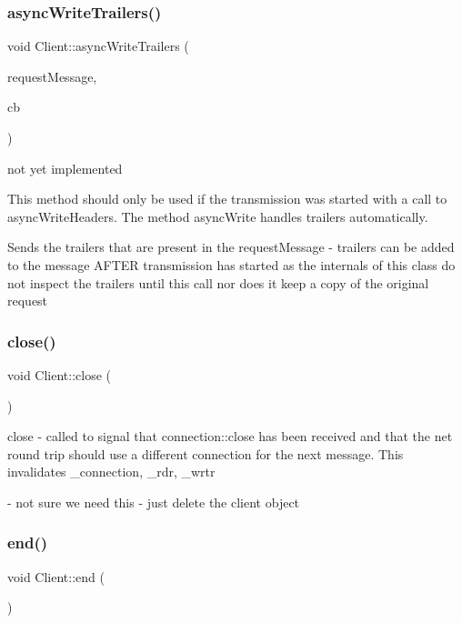 \subsubsection{\texorpdfstring{async\+Write\+Trailers()}{asyncWriteTrailers()}}
{\footnotesize\ttfamily void Client\+::async\+Write\+Trailers (\begin{DoxyParamCaption}\item[{Message\+Base\+S\+Ptr}]{request\+Message,  }\item[{Async\+Write\+Callback\+Type}]{cb }\end{DoxyParamCaption})}

not yet implemented

This method should only be used if the transmission was started with a call to async\+Write\+Headers. The method async\+Write handles trailers automatically.

Sends the trailers that are present in the request\+Message -\/ trailers can be added to the message A\+F\+T\+ER transmission has started as the internals of this class do not inspect the trailers until this call nor does it keep a copy of the original request \mbox{\label{class_client_a2ac4838875e743af25125d8b5c8eba09}} 
\subsubsection{\texorpdfstring{close()}{close()}}
{\footnotesize\ttfamily void Client\+::close (\begin{DoxyParamCaption}{ }\end{DoxyParamCaption})}

close -\/ called to signal that connection\+::close has been received and that the net round trip should use a different connection for the next message. This invalidates \+\_\+connection, \+\_\+rdr, \+\_\+wrtr

-\/ not sure we need this -\/ just delete the client object \mbox{\label{class_client_ae60322d424fa33d49cd88e6bee08e7af}} 
\subsubsection{\texorpdfstring{end()}{end()}}
{\footnotesize\ttfamily void Client\+::end (\begin{DoxyParamCaption}{ }\end{DoxyParamCaption})}

